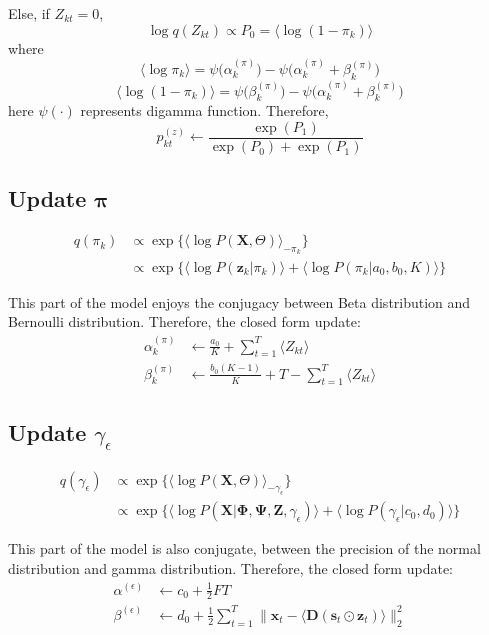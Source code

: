 \documentclass[11pt]{article} %
\begin{document}
Else, if $Z_{kt} = 0$,
\[
\log q(Z_{kt}) \propto P_0 = \langle \log (1-\pi_k) \rangle
\]
where 
\[
\langle \log \pi_k \rangle = \psi\big(\alpha_k^{(\pi)}\big) - \psi\big(\alpha_k^{(\pi)} + \beta_k^{(\pi)}\big)
\]
\[
\langle \log(1- \pi_k) \rangle = \psi\big(\beta_k^{(\pi)}\big) - \psi\big(\alpha_k^{(\pi)} + \beta_k^{(\pi)}\big)
\]
here $\psi(\cdot)$ represents digamma function. 
Therefore, 
\[
p_{kt}^{(z)} \leftarrow \frac{\exp(P_1)}{\exp(P_0) + \exp(P_1)}
\]

\subsection{Update $\bm{\pi}$}
\begin{align*}
q(\pi_k) &\propto \exp\{\langle\log P(\mathbf{X}, \Theta)\rangle_{-\pi_k}\}\\
&\propto \exp\{\langle \log P(\bm{z}_{k} | \pi_k) \rangle + \langle \log P(\pi_k | a_0, b_0, K) \rangle \}
\end{align*}

This part of the model enjoys the conjugacy between Beta distribution and Bernoulli distribution. Therefore, the closed form update:
\begin{align*}
\alpha_k^{(\pi)} &\leftarrow \frac{a_0}{K} + \sum_{t=1}^T \langle Z_{kt} \rangle\\
\beta_k^{(\pi)} &\leftarrow \frac{b_0 (K-1)}{K} + T - \sum_{t=1}^T \langle Z_{kt} \rangle
\end{align*}

\subsection{Update $\gamma_\epsilon$}
\begin{align*}
q(\gamma_\epsilon) &\propto \exp\{\langle\log P(\mathbf{X}, \Theta)\rangle_{-\gamma_\epsilon}\}\\
&\propto \exp\{\langle \log P(\mathbf{X} | \mathbf{\Phi}, \mathbf{\Psi}, \mathbf{Z},  \gamma_\epsilon)\rangle + \langle \log P(\gamma_\epsilon | c_0, d_0) \rangle \}
\end{align*}

This part of the model is also conjugate, between the precision of the normal distribution and gamma distribution. Therefore, the closed form update:
\begin{align*}
\alpha^{(\epsilon)} &\leftarrow  c_0 + \frac{1}{2} FT\\
\beta^{(\epsilon)} &\leftarrow d_0 + \frac{1}{2}\sum_{t=1}^T \parallel \bm{x}_t - \langle \mathbf{D} ( \bm{s}_t \odot  \bm{z}_t ) \rangle \parallel_2^2
\end{align*}




\end{document}
